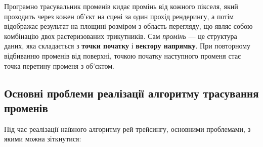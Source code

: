Програмно трасувальник променів кидає промінь від кожного пікселя, який проходить через кожен об'єкт на сцені за один прохід рендерингу, а потім відображає результат на площині розміром з область перегляду, що являє собою комбінацію двох растеризованих трикутників. Сам \textit{промінь} --- це структура даних, яка складається з \textbf{точки початку} і \textbf{вектору напрямку}. При повторному відбиванню променів від поверхні, точкою початку наступного променя стає точка перетину променя з об'єктом.

\subsection{Основні проблеми реалізації алгоритму трасування променів}
Під час реалізації наївного алгоритму рей трейсингу, основними проблемами, з якими можна зіткнутися:

